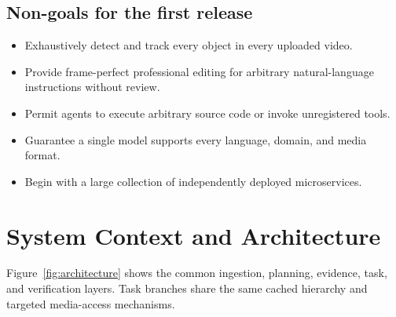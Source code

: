 \documentclass[11pt]{article}
\begin{document}
\subsection{Non-goals for the first release}

\begin{itemize}
  \item Exhaustively detect and track every object in every uploaded video.
  \item Provide frame-perfect professional editing for arbitrary natural-language
  instructions without review.
  \item Permit agents to execute arbitrary source code or invoke unregistered tools.
  \item Guarantee a single model supports every language, domain, and media format.
  \item Begin with a large collection of independently deployed microservices.
\end{itemize}

\section{System Context and Architecture}

Figure~\ref{fig:architecture} shows the common ingestion, planning, evidence,
task, and verification layers. Task branches share the same cached hierarchy and
targeted media-access mechanisms.
\end{document}
